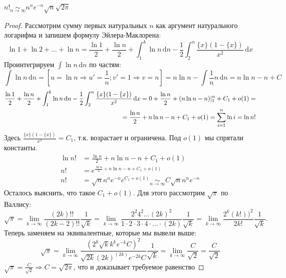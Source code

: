 \documentclass{article}
\def\D{\,\mathrm{d}}
\begin{document}
$n! \underset{n \rightarrow \infty}{\sim} n^ne^{-n}\sqrt{n}\sqrt{2\pi}$

\begin{proof}
Рассмотрим сумму первых натуральных $n$ как аргумент натурального логарифма и запишем формулу Эйлера-Маклорена:
\begin{equation*}
\ln{1} + \ln{2} + \ldots + \ln{n} = \frac{\ln{1}} {2}+ \frac{\ln{n}} {2} + \int_1^k \ln{n}\D n - \frac{1} {2} \int_2 ^n \frac{\{x\} ( 1- \{x\})} {x^2} \D x
\end{equation*}
Проинтегрируем $\int \ln{n} \D n$ по частям:
\begin{equation*}
\int \ln{n} \D n = [u = \ln{n} \Rightarrow u' = \frac{1} {n}; v' = 1 \Rightarrow v = n] = n \ln{n} - \int \frac{1} {n} n\D n = n\ln{n} - n + C
\end{equation*}
\begin{align*}
\frac{\ln{1}} {2}+ \frac{\ln{n}} {2} + \int_1^k \ln{n}\D n - \frac{1} {2} \int_2 ^n \frac{\{x\} ( 1- \{x\})} {x^2} \D x  = 0 + \frac{\ln{n}} {2} + (n\ln{n} - n)\arrowvert^n_1 + C_1 + o(1)=\\ = \frac{\ln{n}} {2} + n\ln{n} - n + C_1 + o(1) = \sum_{i = 1}^n \ln{i} = \ln{n!}
\end{align*}
Здесь $ \frac{\{x\} ( 1- \{x\})} {x^2} = C_1$, т.к. возрастает и ограничена. Под $o(1)$ мы спрятали константы.
\begin{align*}
\ln{n!} &= \frac{\ln{n}} {2} + n \ln{n} - n + C_1 + o(1)\\
n! &= e^{\frac{\ln{n}} {2} + n \ln{n} - n + C_1 + o(1)}\\
n! &= \sqrt{n} n^n e^{-n} e^{C_1 + o(1)}  \underset{n\to \infty}{\sim} C\sqrt{n}n^n e^{-n}
\end{align*}
Осталось выяснить, что такое $C_1 + o(1)$. Для этого рассмотрим $\sqrt{\pi}$ по Валлису:
\begin{equation*}
\sqrt{\pi} = \lim_{k\to\infty} \frac{(2k)!!} {(2k-2)!!} \frac{1} {\sqrt{k}} = \lim_{k\to\infty} \frac{2^2 4^2\ldots (2k)^2} {1\cdot2\cdot3\cdot4\cdot \ldots\cdot (2k)} \frac{1} {\sqrt{k}} = \lim_{k\to\infty} \frac{2^k (k!))^2} {2k!} \frac{1} {\sqrt{k}}.
\end{equation*}
Теперь заменяем на эквивалентные, которые мы вывели выше:
\begin{equation*}
\sqrt{\pi} = \lim_{k\to\infty} \frac{(2^k \sqrt{k} k^k e^{-k} C)^2} {\sqrt{2k} (2k)^{(2k)} e^{-2k} C} \frac{1} {\sqrt{k}} = \lim_{k\to\infty} \frac{C} {\sqrt{2}} = \frac{C} {\sqrt{2}}
\end{equation*}
$\sqrt{\pi} = \frac{C}{\sqrt{2}} \Rightarrow C = \sqrt{2\pi}$, что и доказывает требуемое равенство
\end{proof}
\end{document}

